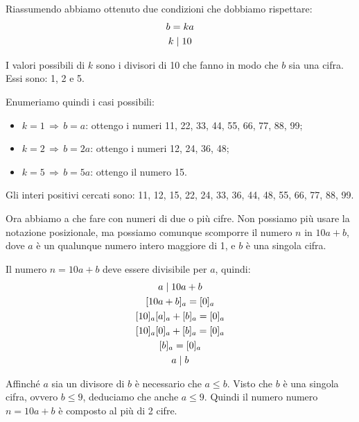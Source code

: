 \begin{soluzione}
    Riassumendo abbiamo ottenuto due condizioni che dobbiamo rispettare:
    \begin{gather*}
        b = ka \\
        k  \mid  10
    \end{gather*}

    I valori possibili di $k$ sono i divisori di 10 che fanno in modo che $b$ sia una cifra.
    Essi sono: 1, 2 e 5.

    Enumeriamo quindi i casi possibili:
    \begin{itemize}
        \item $k = 1 \,\Longrightarrow\, b = a$: ottengo i numeri 11, 22, 33, 44, 55, 66, 77, 88, 99;
        \item $k = 2 \,\Longrightarrow\, b = 2a$: ottengo i numeri 12, 24, 36, 48;
        \item $k = 5 \,\Longrightarrow\, b = 5a$: ottengo il numero 15.
    \end{itemize}

    \bigskip
    Gli interi positivi cercati sono: 11, 12, 15, 22, 24, 33, 36, 44, 48, 55, 66, 77, 88, 99.

    \bigskip
    Ora abbiamo a che fare con numeri di due o più cifre.
    Non possiamo più usare la notazione posizionale, ma possiamo comunque scomporre il numero $n$ in $10a + b$,
    dove $a$ è un qualunque numero intero maggiore di 1, e $b$ è una singola cifra.

    Il numero $n = 10a + b$ deve essere divisibile per $a$, quindi:
    \begin{gather*}
        a  \mid  10a + b \\
        [10a + b]_a = [0]_a \\
        [10]_a[a]_a + [b]_a = [0]_a \\
        [10]_a[0]_a + [b]_a = [0]_a \\
        [b]_a = [0]_a \\
        a  \mid  b
    \end{gather*}

    Affinché $a$ sia un divisore di $b$ è necessario che $a \le b$.
    Visto che $b$ è una singola cifra, ovvero $b \le 9$, deduciamo che anche $a \le 9$.
    Quindi il numero numero $n = 10a + b$ è composto al più di 2 cifre.
\end{soluzione}

